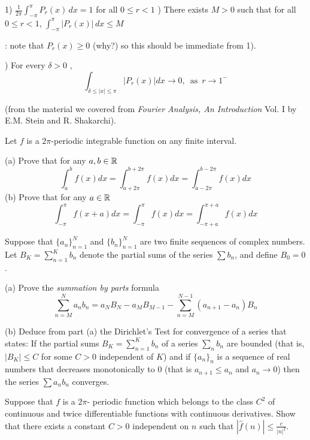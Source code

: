 {1)   $ \frac{1}{2\pi} \int_{-\pi}^{\pi}  P_r(x) \, dx  = 1 $  for all $ 0 \leq r < 1$ 
) There exists $M >0$ such that for all  $ 0 \leq r < 1$, $ \int_{-\pi}^{\pi}  |P_r(x) | \, dx  \leq M $   
\smallskip

: note that  $P_r(x)  \geq 0$ (why?) so this should be immediate from 1).

) For every $\delta >0$ , \, $$\int_{\delta \leq |x| \leq \pi}  |P_r(x) |  dx \to 0, \, \text{ as } \,  r \to 1^{-}$$
 




\enddocument

\smallskip
{ (from the material we covered from {\it Fourier Analysis, An Introduction} Vol. I by E.M. Stein and R. Shakarchi).

\smallskip

  Let $f$ is a $2\pi$-periodic integrable function on any finite interval.

(a) Prove  that for any $a, b \in \Bbb R$ 
$$  \int_a^b f(x) d x  = \int_{a+ 2\pi}^{b+2\pi} f(x) dx = \int_{a- 2\pi}^{b -2\pi} f(x) dx $$
(b) Prove  that for any $a \in \Bbb R$ $$  \int_{-\pi}^{\pi} f(x+a) d x  = \int_{-\pi}^{\pi} f(x) dx = \int_{- \pi +a }^{\pi+a} f(x) dx $$

\medskip

  Suppose that  $\{a_n\}_{n=1}^N$ and $\{b_n\}_{n=1}^N$ are two finite sequences of complex numbers. Let $B_K = \sum_{n=1}^K  b_n$ denote the partial sums of the series $\sum b_n$, and define $B_0=0$. 

(a)  Prove the {\it summation by parts} formula 
$$\sum_{n=M}^N   a_n b_n = a_N B_N - a_M B_{M-1} - \sum_{n=M}^{N-1}  (a_{n+1} - a_n) B_n $$

\smallskip

(b)  Deduce from part (a) the Dirichlet's Test for convergence of a series that states:  If the partial sums $B_K =\sum_{n=1}^K  b_n $    of a series $\sum_n  b_n $ are bounded  (that is, $| B_K| \leq C$ for some $C>0$ independent of $K$) and  if  $\{a_n\}_n$ is a sequence of real numbers that decreases monotonically to $0$ (that is $a_{n+1} \leq a_n$ and 
$a_n \to 0$) then  the series $\sum a_n b_n$ converges.

\medskip

  Suppose that $f$ is a $2\pi$- periodic function which belongs to the class $C^2$ of continuous and twice differentiable functions 
with continuous derivatives.  Show that  there exists a constant $C>0$  independent on $n$ such that $ |\widehat{f}(n)| \leq \frac{c}{|n|^2} $.

}}
